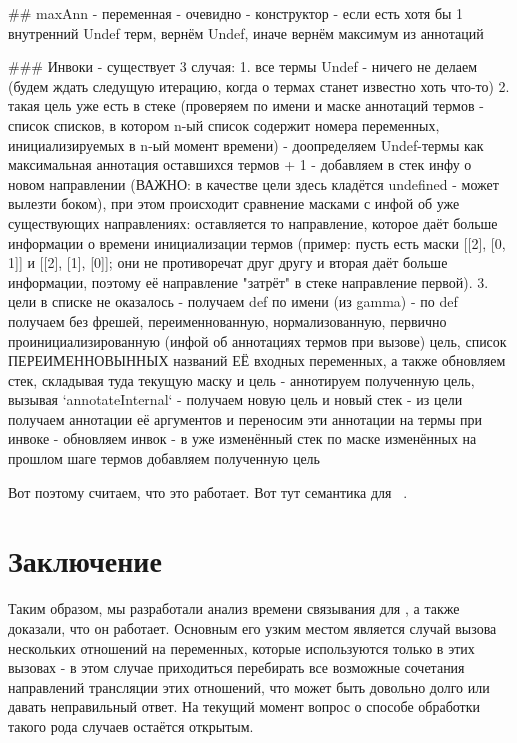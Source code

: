 \documentclass[conference]{IEEEtran}
\begin{document}
\#\# maxAnn
- переменная - очевидно
- конструктор - если есть хотя бы 1 внутренний Undef терм, вернём Undef, иначе вернём максимум из аннотаций

\#\#\# Инвоки
- существует 3 случая:
1. все термы Undef
  - ничего не делаем (будем ждать следущую итерацию, когда о термах станет известно хоть что-то)
2. такая цель уже есть в стеке (проверяем по имени и маске аннотаций термов - список списков, в котором n-ый список содержит номера переменных, инициализируемых в n-ый момент времени)
  - доопределяем Undef-термы как максимальная аннотация оставшихся термов + 1
  - добавляем в стек инфу о новом направлении (ВАЖНО: в качестве цели здесь кладётся undefined - может вылезти боком), при этом происходит сравнение масками с инфой об уже существующих направлениях: оставляется то направление, которое даёт больше информации о времени инициализации термов (пример: пусть есть маски [[2], [0, 1]] и [[2], [1], [0]]; они не противоречат друг другу и вторая даёт больше информации, поэтому её направление "затрёт" в стеке направление первой).
3. цели в списке не оказалось
  - получаем def по имени (из gamma)
  - по def получаем без фрешей, переименнованную, нормализованную, первично проинициализированную (инфой об аннотациях термов при вызове) цель, список ПЕРЕИМЕННОВЫННЫХ названий ЕЁ входных переменных, а также обновляем стек, складывая туда текущую маску и цель
  - аннотируем полученную цель, вызывая `annotateInternal` - получаем новую цель и новый стек
  - из цели получаем аннотации её аргументов и переносим эти аннотации на термы при инвоке - обновляем инвок
  - в уже изменённый стек по маске изменённых на прошлом шаге термов добавляем полученную цель


Вот поэтому считаем, что это работает. Вот тут семантика для \miniKanren~\cite{rozplokhas2019certified}.

\section{Заключение}\label{conclusion}

Таким образом, мы разработали анализ времени связывания для \miniKanren, а также доказали, что он работает. Основным его узким местом является случай вызова нескольких отношений на переменных, которые используются только в этих вызовах - в этом случае приходиться перебирать все возможные сочетания направлений трансляции этих отношений, что может быть довольно долго или давать неправильный ответ. На текущий момент вопрос о способе обработки такого рода случаев остаётся открытым.
\end{document}
